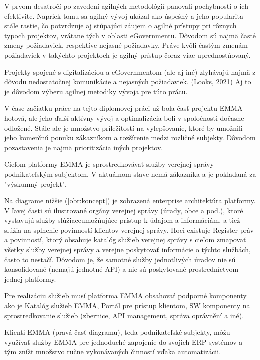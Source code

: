 V prvom desaťročí po zavedení agilných metodológií panovali pochybnosti o ich efektivite. Napriek tomu sa agilný vývoj ukázal ako úspešný a jeho popularita stále rastie, čo potvrdzuje aj stúpajúci záujem o agilné prístupy pri rôznych typoch projektov, vrátane tých v oblasti eGovernmentu. Dôvodom sú najmä časté zmeny požiadaviek, respektíve nejasné požiadavky. Práve kvôli častým zmenám požiadaviek v takýchto projektoch je agilný prístup čoraz viac uprednostňovaný.

Projekty spojené s digitalizáciou a eGovernmentom (ale aj iné) zlyhávajú najmä z dôvodu nedostatočnej komunikácie a nejasných požiadaviek. \scr(Looks, 2021) Aj to je dôvodom výberu agilnej metodiky vývoja pre túto prácu.

V čase začiatku práce na tejto diplomovej práci už bola časť projektu EMMA hotová, ale  jeho ďalší aktívny vývoj a optimalizácia boli v spoločnosti dočasne odložené. Stále ale je množstvo príležitostí na vylepšovanie, ktoré by umožnili jeho komerčnú ponuku zákazníkom a rozšírenie medzi rozličné subjekty. Dôvodom pozastavenia je najmä prioritizácia iných projektov.

Cieľom platformy EMMA je sprostredkovávať služby verejnej správy podnikateľským subjektom. V aktuálnom stave nemá zákazníka a je pokladaná za "výskumný projekt".

Na diagrame nižšie ([obr:koncept]) je zobrazená enterprise architektúra platformy. V ľavej časti sú ilustrované orgány verejnej správy (úrady, obce a pod.), ktoré vystavujú služby slúžiaceumožňujúce prístup k údajom a informáciám, a tiež slúžia na splnenie povinností klientov verejnej správy. Hoci existuje Register práv a povinností, ktorý obsahuje katalóg služieb verejnej správy s cieľom zmapovať všetky služby verejnej správy a verejne poskytovať informácie o týchto službách, často to nestačí. Dôvodom je, že samotné služby jednotlivých úradov nie sú konsolidované (nemajú jednotné API) a nie sú poskytované prostredníctvom jednej platformy.

Pre realizáciu služieb musí platforma EMMA obsahovať podporné komponenty ako je Katalóg služieb EMMA, Portál pre prístup klientom, SW komponenty na sprostredkovanie služieb (zbernice, API management, správa oprávnění a iné). 

Klienti EMMA (pravá časť diagramu), teda podnikateľské subjekty, môžu využívať služby EMMA pre jednoduché zapojenie do svojich ERP systémov a tým znížt množstvo ručne vykonávaných činností vďaka automatizácii.

